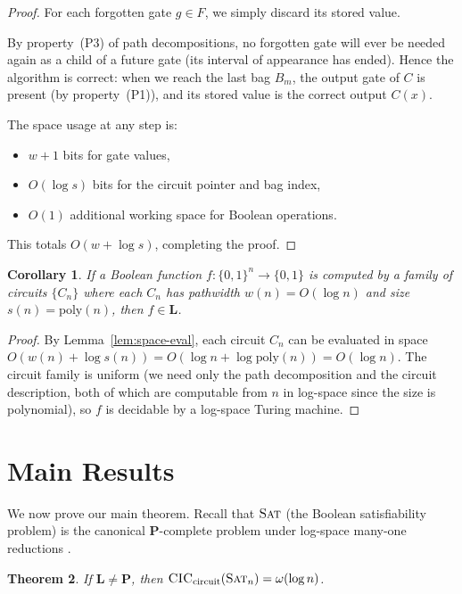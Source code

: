 \documentclass[11pt]{article}
\newtheorem{theorem}{Theorem}
\newtheorem{corollary}[theorem]{Corollary}
\newcommand{\SAT}{\textsc{Sat}}
\newcommand{\CIC}{\textsc{CIC}}
\newcommand{\poly}{\mathrm{poly}}
\begin{document}
\begin{proof}
  For each forgotten gate $g \in F$, we simply discard its stored value.

  By property~(P3) of path decompositions, no forgotten gate will ever be
  needed again as a child of a future gate (its interval of appearance has
  ended).  Hence the algorithm is correct: when we reach the last bag
  $B_m$, the output gate of $C$ is present (by property~(P1)), and its
  stored value is the correct output $C(x)$.

  The space usage at any step is:
  \begin{itemize}
    \item $w+1$ bits for gate values,
    \item $O(\log s)$ bits for the circuit pointer and bag index,
    \item $O(1)$ additional working space for Boolean operations.
  \end{itemize}
  This totals $O(w + \log s)$, completing the proof.
\end{proof}

\begin{corollary}
  \label{cor:logspace}
  If a Boolean function $f : \{0,1\}^n \to \{0,1\}$ is computed by a family
  of circuits $\{C_n\}$ where each $C_n$ has pathwidth $w(n) = O(\log n)$ and
  size $s(n) = \poly(n)$, then $f \in \mathbf{L}$.
\end{corollary}

\begin{proof}
  By Lemma~\ref{lem:space-eval}, each circuit $C_n$ can be evaluated in
  space $O(w(n) + \log s(n)) = O(\log n + \log \poly(n)) = O(\log n)$.
  The circuit family is uniform (we need only the path decomposition and the
  circuit description, both of which are computable from $n$ in log-space
  since the size is polynomial), so $f$ is decidable by a log-space Turing
  machine.
\end{proof}

\section{Main Results}

We now prove our main theorem.  Recall that $\SAT$ (the Boolean satisfiability
problem) is the canonical $\mathbf{P}$-complete problem under log-space
many-one reductions \cite{Lad75}.

\begin{theorem}
  \label{thm:main}
  If $\mathbf{L} \neq \mathbf{P}$, then
  $\CIC_{\text{circuit}}(\SAT_n) = \omega(\log n)$.
\end{theorem}
\end{document}
